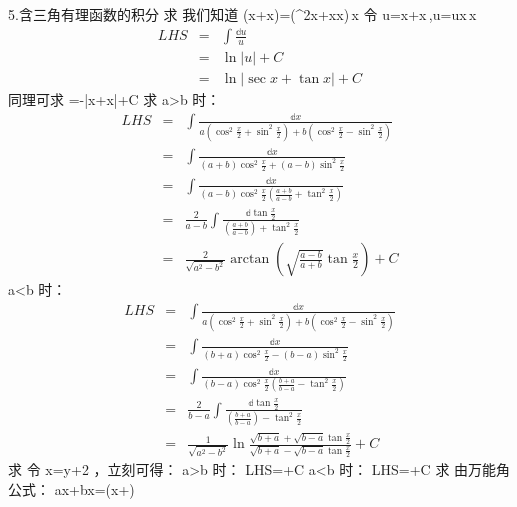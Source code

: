 5.含三角有理函数的积分
求 \int {}
我们知道 \left(\sec x+\tan x\right)=(\sec^2x+\tan x\sec x)\,x
令 u=\sec x+\tan x\,,u=u\sec x\,x
\begin{eqnarray} LHS&=&\int\frac{\mathbb{d}u}u\\ &=&\ln|u|+C\\ &=&\ln|\sec x+\tan x|+C \end{eqnarray}
同理可求 \int {}=-\ln|\csc x+\cot x|+C
求\int{}
a>b 时：
\begin{eqnarray} LHS&=&\int\frac{\mathbb{d}x}{a\left(\cos^2\frac{x}{2}+\sin^2\frac{x}{2}\right)+b\left(\cos^2\frac{x}{2}-\sin^2\frac{x}{2}\right)}\\ &=&\int\frac{\mathbb{d}x}{(a+b)\cos^2\frac{x}{2}+(a-b)\sin^2\frac{x}{2}}\\ &=&\int\frac{\mathbb{d}x}{(a-b)\cos^2\frac{x}{2}\left(\frac{a+b}{a-b}+\tan^2\frac{x}{2}\right)}\\ &=&\frac{2}{a-b}\int\frac{\mathbb{d}\tan\frac{x}2}{\left(\frac{a+b}{a-b}\right)+\tan^2\frac{x}{2}}\\ &=&\frac{2}{\sqrt{a^2-b^2}}\arctan\left(\sqrt{\frac{a-b}{a+b}}\tan\frac{x}2\right)+C \end{eqnarray}
a<b 时：
\begin{eqnarray} LHS&=&\int\frac{\mathbb{d}x}{a\left(\cos^2\frac{x}{2}+\sin^2\frac{x}{2}\right)+b\left(\cos^2\frac{x}{2}-\sin^2\frac{x}{2}\right)}\\ &=&\int\frac{\mathbb{d}x}{(b+a)\cos^2\frac{x}{2}-(b-a)\sin^2\frac{x}{2}}\\ &=&\int\frac{\mathbb{d}x}{(b-a)\cos^2\frac{x}{2}\left(\frac{b+a}{b-a}-\tan^2\frac{x}{2}\right)}\\ &=&\frac{2}{b-a}\int\frac{\mathbb{d}\tan\frac{x}2}{\left(\frac{b+a}{b-a}\right)-\tan^2\frac{x}{2}}\\ &=&\frac{1}{\sqrt{a^2-b^2}}\ln\frac{\sqrt{b+a}+\sqrt{b-a}\tan\frac{x}2}{\sqrt{b+a}-\sqrt{b-a}\tan\frac{x}2}+C \end{eqnarray}
求 \int{}
令 x=y+\frac{\pi}2 ，立刻可得：
a>b 时： LHS=\arctan{}+C
a<b 时： LHS=\ln{}+C
求 \int{}
由万能角公式： a\sin x+b\cos x=\sin(x+\alpha)
